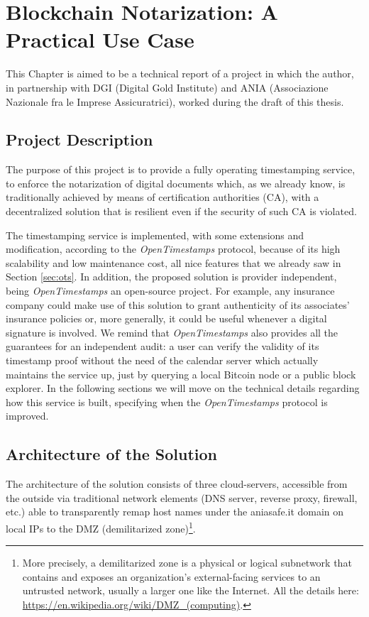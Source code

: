 \chapter{Blockchain Notarization: A Practical Use Case}
\label{chpr:project}
This Chapter is aimed to be a technical report of a project in which the author, in partnership with DGI (Digital Gold Institute) and ANIA (Associazione Nazionale fra le Imprese Assicuratrici), worked during the draft of this thesis.

\bigskip
\section{Project Description}
\label{sec:summary}
The purpose of this project is to provide a fully operating timestamping service, to enforce the notarization of digital documents which, as we already know, is traditionally achieved by means of certification authorities (CA), with a decentralized solution that is resilient even if the security of such CA is violated.

\bigskip
\noindent
The timestamping service is implemented, with some extensions and modification, according to the \textit{OpenTimestamps} protocol, because of its high scalability and low maintenance cost, all nice features that we already saw in Section \ref{sec:ots}. In addition, the proposed solution is provider independent, being \textit{OpenTimestamps} an open-source project. For example, any insurance company could make use of this solution to grant authenticity of its associates' insurance policies or, more generally, it could be useful whenever a digital signature is involved. We remind that \textit{OpenTimestamps} also provides all the guarantees for an independent audit: a user can verify the validity of its timestamp proof without the need of the calendar server which actually maintains the service up, just by querying a local Bitcoin node or a public block explorer. In the following sections we will move on the technical details regarding how this service is built, specifying when the \textit{OpenTimestamps} protocol is improved.

\bigskip
\section{Architecture of the Solution}
\label{sec:architecture}
The architecture of the solution consists of three cloud-servers, accessible from the outside via traditional network elements (DNS server, reverse proxy, firewall, etc.) able to transparently remap host names under the aniasafe.it domain on local IPs to the DMZ (demilitarized zone)\footnote{More precisely, a demilitarized zone is a physical or logical subnetwork that contains and exposes an organization's external-facing services to an untrusted network, usually a larger one like the Internet. All the details here: \url{https://en.wikipedia.org/wiki/DMZ_(computing)}.}.

